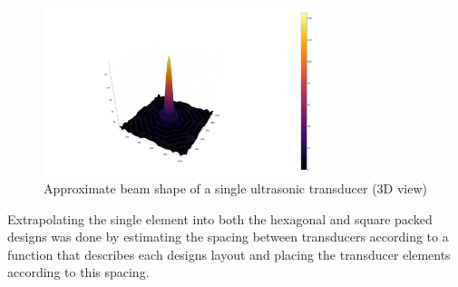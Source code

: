 \begin{figure}[ht!]
    \centering
    \includegraphics[width=0.7\textwidth]{Figures/arraySim/single/beampat3D.png}
    \caption{Approximate beam shape of a single ultrasonic transducer (3D view)}
    \label{fig:single_elem_3Dbeam}
\end{figure}
\newpage
Extrapolating the single element into both the hexagonal and square packed designs was done by estimating the spacing between transducers according to a function that describes each designs layout and placing the transducer elements according to this spacing. 
